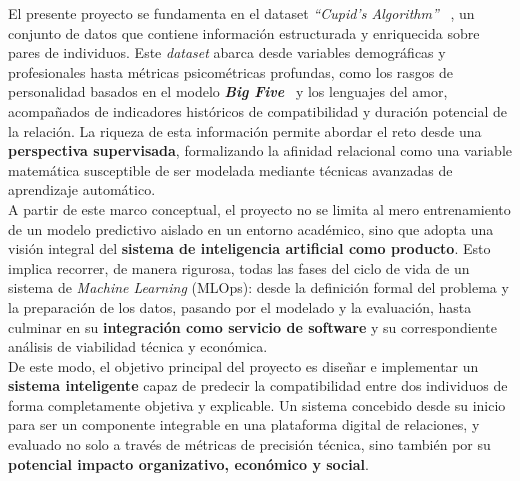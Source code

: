El presente proyecto se fundamenta en el dataset \textit{“Cupid’s Algorithm”} ~\cite{dataset_cupid}, un conjunto de datos que contiene información estructurada y enriquecida sobre pares de individuos. Este \textit{dataset} abarca desde variables demográficas y profesionales hasta métricas psicométricas profundas, como los rasgos de personalidad basados en el modelo \textbf{\textit{Big Five}}~\cite{rakic2024bigfive} y los lenguajes del amor, acompañados de indicadores históricos de compatibilidad y duración potencial de la relación. La riqueza de esta información permite abordar el reto desde una \textbf{perspectiva supervisada}, formalizando la afinidad relacional como una variable matemática susceptible de ser modelada mediante técnicas avanzadas de aprendizaje automático.\\

A partir de este marco conceptual, el proyecto no se limita al mero entrenamiento de un modelo predictivo aislado en un entorno académico, sino que adopta una visión integral del \textbf{sistema de inteligencia artificial como producto}. Esto implica recorrer, de manera rigurosa, todas las fases del ciclo de vida de un sistema de \textit{Machine Learning} (MLOps): desde la definición formal del problema y la preparación de los datos, pasando por el modelado y la evaluación, hasta culminar en su \textbf{integración como servicio de software} y su correspondiente análisis de viabilidad técnica y económica.\\

De este modo, el objetivo principal del proyecto es diseñar e implementar un \textbf{sistema inteligente} capaz de predecir la compatibilidad entre dos individuos de forma completamente objetiva y explicable. Un sistema concebido desde su inicio para ser un componente integrable en una plataforma digital de relaciones, y evaluado no solo a través de métricas de precisión técnica, sino también por su \textbf{potencial impacto organizativo, económico y social}.